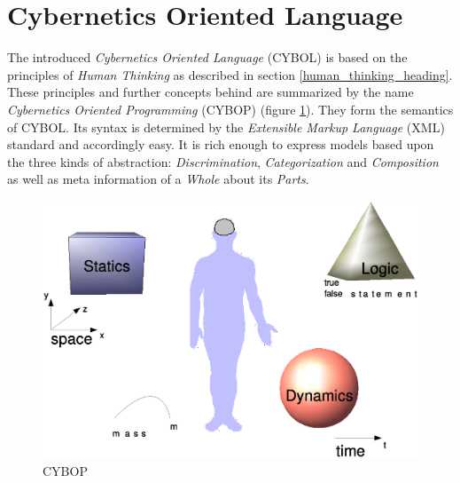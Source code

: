 %
%
%
%
%
%
%

\section{Cybernetics Oriented Language}
\label{cybernetics_oriented_language_heading}

The introduced \emph{Cybernetics Oriented Language} (CYBOL) is based on the
principles of \emph{Human Thinking} as described in section \ref{human_thinking_heading}.
These principles and further concepts behind are summarized by the name
\emph{Cybernetics Oriented Programming} (CYBOP) (figure \ref{cybop_figure}).
They form the semantics of CYBOL. Its syntax is determined by the \emph{Extensible
Markup Language} (XML) standard and accordingly easy. It is rich enough to express
models based upon the three kinds of abstraction: \emph{Discrimination},
\emph{Categorization} and \emph{Composition} as well as meta information of a
\emph{Whole} about its \emph{Parts}.

\begin{figure}[ht]
    \begin{center}
        \includegraphics[scale=0.3]{vector/cybop.eps}
        \caption{CYBOP}
        \label{cybop_figure}
    \end{center}
\end{figure}





